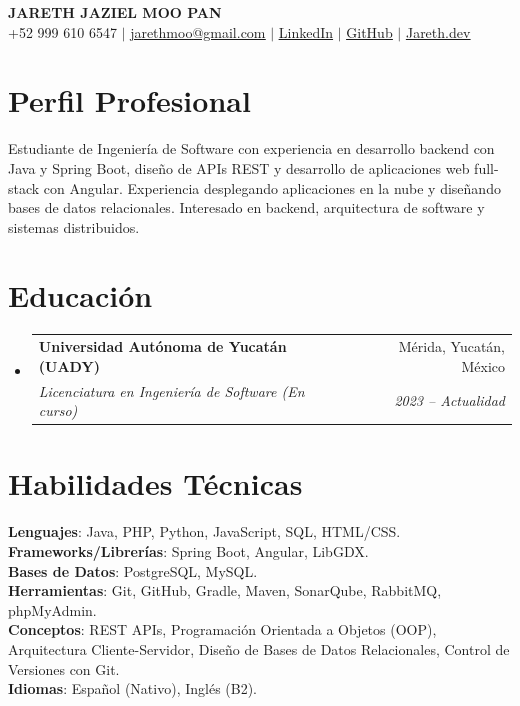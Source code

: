 \documentclass[letterpaper,12pt]{article}
\makeatletter
\newcommand{\resumeSubheading}[4]{
  \vspace{-2pt}\item
    \begin{tabular*}{0.97\textwidth}[t]{l@{\extracolsep{\fill}}r}
      \textbf{#1} & #2 \\
      \textit{\small#3} & \textit{\small #4} \\
    \end{tabular*}\vspace{-7pt}
}
\newcommand{\resumeSubHeadingListStart}{\begin{itemize}[leftmargin=0.15in, label={}]}
\newcommand{\resumeSubHeadingListEnd}{\end{itemize}}
\newcommand{\cvlink}[2]{\href{#1}{\underline{#2}}}
\makeatother
\begin{document}
\begin{center}
    \textbf{\Huge \scshape JARETH JAZIEL MOO PAN} \\ \vspace{5pt}
    \small +52 999 610 6547 $|$ 
    \cvlink{mailto:jarethmoo@gmail.com}{jarethmoo@gmail.com} $|$ 
    \cvlink{https://linkedin.com/in/jareth-moo-6b8500271}{LinkedIn} $|$
    \cvlink{https://github.com/JarethJaziel}{GitHub} $|$
    \cvlink{https://jarethjaziel.github.io/Jareth.dev/}{Jareth.dev}
\end{center}

\section{Perfil Profesional}
Estudiante de Ingeniería de Software con experiencia en desarrollo backend con Java y Spring Boot, diseño de APIs REST y desarrollo de aplicaciones web full-stack con Angular. Experiencia desplegando aplicaciones en la nube y diseñando bases de datos relacionales. Interesado en backend, arquitectura de software y sistemas distribuidos.
\section{Educación}
  \resumeSubHeadingListStart
    \resumeSubheading
      {Universidad Autónoma de Yucatán (UADY)}{Mérida, Yucatán, México}
      {Licenciatura en Ingeniería de Software (En curso)}{2023 -- Actualidad}
  \resumeSubHeadingListEnd

\section{Habilidades Técnicas}
 \begin{itemize}[leftmargin=0.15in, label={}]
    \small{\item{
     \textbf{Lenguajes}{: Java, PHP, Python, JavaScript, SQL, HTML/CSS.}\\
     \textbf{Frameworks/Librerías}{: Spring Boot, Angular, LibGDX.}\\
     \textbf{Bases de Datos}{: PostgreSQL, MySQL.}\\
     \textbf{Herramientas}{: Git, GitHub, Gradle, Maven, SonarQube, RabbitMQ, phpMyAdmin.}\\
     \textbf{Conceptos}{: REST APIs, Programación Orientada a Objetos (OOP),
     Arquitectura Cliente-Servidor, Diseño de Bases de Datos Relacionales,
     Control de Versiones con Git.}\\
     \textbf{Idiomas}{: Español (Nativo), Inglés (B2).}
    }}
 \end{itemize}
\end{document}
